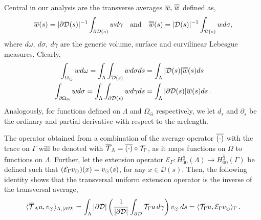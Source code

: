 \documentclass[r]{siamart171218}
\newcommand{\miroold}[1]{{\color{black}#1}}
\begin{document}
Central in our analysis are the transverse averages $\overline{w},\,\overline{\overline{w}}$ defined as, 
\begin{gather*}
\overline{w}(s) = |\partial\mathcal{D}(s)|^{-1} \int_{\partial\mathcal{D}(s)} w d\gamma \quad \mbox{and} \quad 
\overline{\overline{w}}(s) = |\mathcal{D}(s)|^{-1} \int_{\mathcal{D}(s)} w d\sigma, 
\end{gather*}
where $d\omega, \ d\sigma, \ d\gamma$ are the generic volume, surface and curvilinear Lebesgue measures.
Clearly, 
\begin{gather*}
\int_{\Omega_{\ominus}} w d\omega 
= \int_\Lambda \int_{\mathcal{D}(s)} w d\sigma ds
= \int_\Lambda |\mathcal{D}(s)|\overline{\overline{w}}(s) ds\, 
\\
\int_{\partial\Omega_{\ominus}} w d\sigma 
= \int_\Lambda \int_{\partial\mathcal{D}(s)} w d\gamma ds
= \int_\Lambda  |\partial \mathcal{D}(s)| \overline{w}(s) ds\,. 
\end{gather*}
Analogously, for functions defined on $\Lambda$ and $\Omega_\ominus$ respectively, 
we let  $d_s$ and $\partial_s$ be the ordinary and partial derivative with respect to the arclength.

The operator obtained from a combination of the average operator $\overline{(\cdot)}$ with the trace on $\Gamma$ will be denoted with ${\overline{\mathcal{T}}_\Lambda} = \overline{(\cdot)} \circ {\mathcal{T}_\Gamma}$, as it maps functions on $\Omega$ to functions on $\Lambda$.
Further, let the extension operator $\mathcal{E}_{\Gamma}: H^{\frac 1 2}_{00}(\Lambda) \rightarrow H^{\frac 1 2}_{00}(\Gamma)$ be defined such that $(\mathcal{E}_{\miroold{\Gamma}}\vd)(x)=\vd(s)$, for any $x\in \DD(s)$. Then, the following identity shows that the transversal uniform extension operator is the inverse of the transversal average,
\begin{equation}\label{eq:ext}
\langle \mtrace u, \vd \rangle_{\Lambda, |\DD|} 
= \int _{\Lambda} |\DD| \left( \frac{1}{|\DD|} \int_{\DD} \trace u \, d\gamma \right) \vd \, ds 
= \langle \trace u, \ext \vd\rangle_{\Gamma}\,.
\end{equation}

\end{document}
